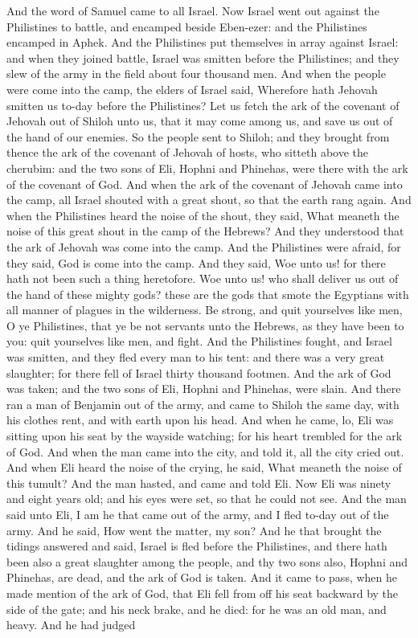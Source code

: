 And the word of Samuel came to all Israel. Now Israel went out against the Philistines to battle, and encamped beside Eben-ezer: and the Philistines encamped in Aphek. And the Philistines put themselves in array against Israel: and when they joined battle, Israel was smitten before the Philistines; and they slew of the army in the field about four thousand men. And when the people were come into the camp, the elders of Israel said, Wherefore hath Jehovah smitten us to-day before the Philistines? Let us fetch the ark of the covenant of Jehovah out of Shiloh unto us, that it may come among us, and save us out of the hand of our enemies. So the people sent to Shiloh; and they brought from thence the ark of the covenant of Jehovah of hosts, who sitteth above the cherubim: and the two sons of Eli, Hophni and Phinehas, were there with the ark of the covenant of God.  And when the ark of the covenant of Jehovah came into the camp, all Israel shouted with a great shout, so that the earth rang again. And when the Philistines heard the noise of the shout, they said, What meaneth the noise of this great shout in the camp of the Hebrews? And they understood that the ark of Jehovah was come into the camp. And the Philistines were afraid, for they said, God is come into the camp. And they said, Woe unto us! for there hath not been such a thing heretofore. Woe unto us! who shall deliver us out of the hand of these mighty gods? these are the gods that smote the Egyptians with all manner of plagues in the wilderness. Be strong, and quit yourselves like men, O ye Philistines, that ye be not servants unto the Hebrews, as they have been to you: quit yourselves like men, and fight. And the Philistines fought, and Israel was smitten, and they fled every man to his tent: and there was a very great slaughter; for there fell of Israel thirty thousand footmen. And the ark of God was taken; and the two sons of Eli, Hophni and Phinehas, were slain.  And there ran a man of Benjamin out of the army, and came to Shiloh the same day, with his clothes rent, and with earth upon his head. And when he came, lo, Eli was sitting upon his seat by the wayside watching; for his heart trembled for the ark of God. And when the man came into the city, and told it, all the city cried out. And when Eli heard the noise of the crying, he said, What meaneth the noise of this tumult? And the man hasted, and came and told Eli. Now Eli was ninety and eight years old; and his eyes were set, so that he could not see. And the man said unto Eli, I am he that came out of the army, and I fled to-day out of the army. And he said, How went the matter, my son? And he that brought the tidings answered and said, Israel is fled before the Philistines, and there hath been also a great slaughter among the people, and thy two sons also, Hophni and Phinehas, are dead, and the ark of God is taken. And it came to pass, when he made mention of the ark of God, that Eli fell from off his seat backward by the side of the gate; and his neck brake, and he died: for he was an old man, and heavy. And he had judged 